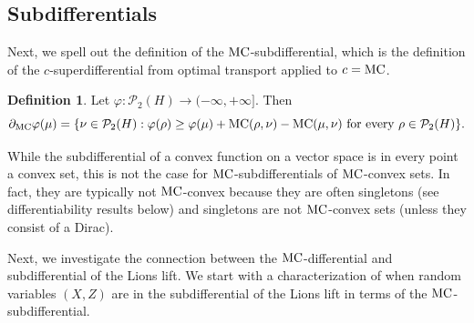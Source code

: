 \documentclass[a4paper]{amsart}
\numberwithin{theorem}{section}
\theoremstyle{definition}
\newtheorem{definition}[theorem]{Definition}
\newcommand{\Pc}{\mathcal P}
\renewcommand{\H}{H}
\renewcommand{\phi}{\varphi}
\newcommand{\mc}{\textup{MC}}
\begin{document}
\subsection{Subdifferentials}

Next, we spell out the definition of the $\mc$-subdifferential, which is the definition of the $c$-superdifferential from optimal transport applied to $c=\mc$.
\begin{definition}\label{def:MCsubdiff}
Let $\phi : \Pc_2(\H) \to (-\infty, +\infty]$. Then 
\[
\partial_{\mc} \phi(\mu) = \{ \nu \in \Pc_2(\H) : \phi(\rho) \ge \phi(\mu) + \mc(\rho,\nu) - \mc(\mu,\nu) \text{ for every } \rho \in \Pc_2(\H)\}.
\]
\end{definition}

While the subdifferential of a convex function on a vector space is in every point a convex set, this is not the case for $\mc$-subdifferentials of $\mc$-convex sets. In fact, they are typically not $\mc$-convex because they are often singletons (see differentiability results below) and singletons are not $\mc$-convex sets (unless they consist of a Dirac).

Next, we investigate the connection between the $\mc$-differential and subdifferential of the Lions lift. We start with a characterization of when random variables $(X,Z)$ are in the subdifferential of the Lions lift in terms of the $\mc$-subdifferential.
\end{document}
